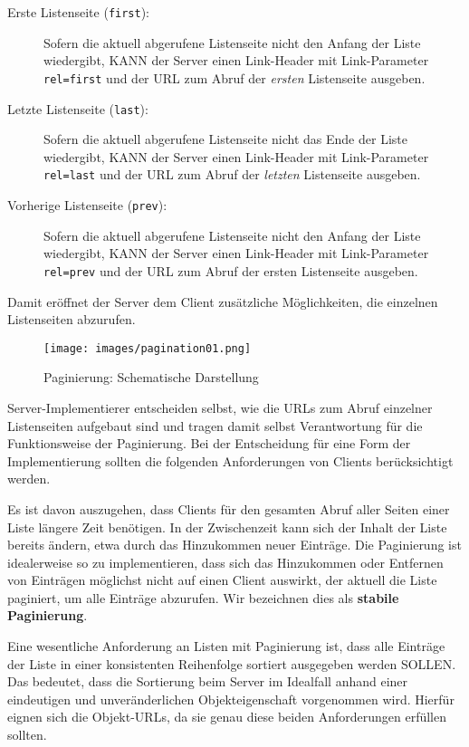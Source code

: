 \documentclass[,a4paper]{article}
\makeatletter
\def\maxwidth{\ifdim\Gin@nat@width>\linewidth\linewidth
\else\Gin@nat@width\fi}
\let\Oldincludegraphics\includegraphics
\renewcommand{\includegraphics}[1]{\Oldincludegraphics[width=\maxwidth]{#1}}
\makeatother
\begin{document}
\begin{description}
\item[Erste Listenseite (\texttt{first}):]
Sofern die aktuell abgerufene Listenseite nicht den Anfang der Liste
wiedergibt, KANN der Server einen Link-Header mit Link-Parameter
\texttt{rel=first} und der URL zum Abruf der \emph{ersten} Listenseite
ausgeben.
\item[Letzte Listenseite (\texttt{last}):]
Sofern die aktuell abgerufene Listenseite nicht das Ende der Liste
wiedergibt, KANN der Server einen Link-Header mit Link-Parameter
\texttt{rel=last} und der URL zum Abruf der \emph{letzten} Listenseite
ausgeben.
\item[Vorherige Listenseite (\texttt{prev}):]
Sofern die aktuell abgerufene Listenseite nicht den Anfang der Liste
wiedergibt, KANN der Server einen Link-Header mit Link-Parameter
\texttt{rel=prev} und der URL zum Abruf der ersten Listenseite ausgeben.
\end{description}

Damit eröffnet der Server dem Client zusätzliche Möglichkeiten, die
einzelnen Listenseiten abzurufen.

\begin{figure}[htbp]
\centering
\texttt{[image: images/pagination01.png]}
\caption{Paginierung: Schematische Darstellung}
\end{figure}

Server-Implementierer entscheiden selbst, wie die URLs zum Abruf
einzelner Listenseiten aufgebaut sind und tragen damit selbst
Verantwortung für die Funktionsweise der Paginierung. Bei der
Entscheidung für eine Form der Implementierung sollten die folgenden
Anforderungen von Clients berücksichtigt werden.

Es ist davon auszugehen, dass Clients für den gesamten Abruf aller
Seiten einer Liste längere Zeit benötigen. In der Zwischenzeit kann sich
der Inhalt der Liste bereits ändern, etwa durch das Hinzukommen neuer
Einträge. Die Paginierung ist idealerweise so zu implementieren, dass
sich das Hinzukommen oder Entfernen von Einträgen möglichst nicht auf
einen Client auswirkt, der aktuell die Liste paginiert, um alle Einträge
abzurufen. Wir bezeichnen dies als \textbf{stabile Paginierung}.

Eine wesentliche Anforderung an Listen mit Paginierung ist, dass alle
Einträge der Liste in einer konsistenten Reihenfolge sortiert ausgegeben
werden SOLLEN. Das bedeutet, dass die Sortierung beim Server im
Idealfall anhand einer eindeutigen und unveränderlichen
Objekteigenschaft vorgenommen wird. Hierfür eignen sich die Objekt-URLs,
da sie genau diese beiden Anforderungen erfüllen sollten.
\end{document}
